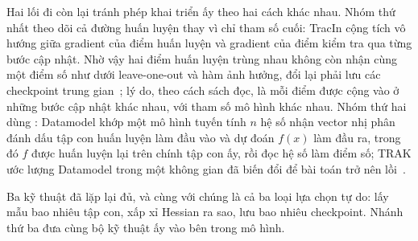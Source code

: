 Hai lối đi còn lại tránh phép khai triển ấy theo hai cách khác nhau. Nhóm thứ
nhất theo dõi cả đường huấn luyện thay vì chỉ tham số cuối: TracIn cộng tích
vô hướng giữa gradient của điểm huấn luyện và gradient của điểm kiểm tra qua
từng bước cập nhật. Nhờ vậy hai điểm huấn luyện trùng nhau không còn nhận cùng
một điểm số như dưới leave-one-out và hàm ảnh hưởng, đổi lại phải lưu các
checkpoint trung gian~\autocite{p18unified}; lý do, theo cách sách đọc, là mỗi
điểm được cộng vào ở những bước cập nhật khác nhau, với tham số mô hình khác
nhau. Nhóm thứ hai dùng
: Datamodel khớp một mô hình tuyến
tính $n$ hệ số nhận vector nhị phân đánh dấu tập con huấn luyện làm đầu vào và
dự đoán $f(x)$ làm đầu ra, trong đó $f$ được huấn luyện lại trên chính tập con
ấy, rồi đọc hệ số làm điểm số; TRAK ước lượng Datamodel trong một không gian đã biến đổi để bài
toán trở nên lồi~\autocite{p18unified}.

Ba kỹ thuật đã lặp lại đủ, và cùng với chúng là cả ba loại lựa chọn tự do: lấy
mẫu bao nhiêu tập con, xấp xỉ Hessian ra sao, lưu bao nhiêu checkpoint. Nhánh
thứ ba đưa cùng bộ kỹ thuật ấy vào bên trong mô hình.

